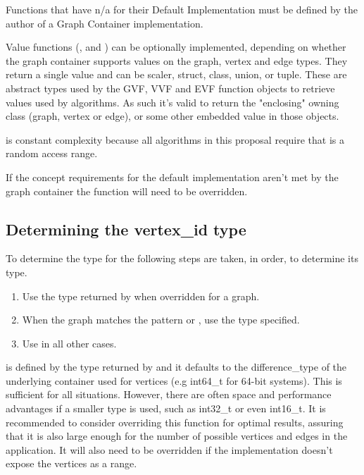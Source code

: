 Functions that have n/a for their Default Implementation must be defined by the author of a Graph Container implementation. 

Value functions (,  and ) can be optionally implemented, 
depending on whether the graph container supports values on the graph, vertex and edge types. They return a single value and can 
be scaler, struct, class, union, or tuple. These are abstract types used by the GVF, VVF and EVF function objects to retrieve
values used by algorithms. As such it's valid to return the "enclosing" owning class (graph, vertex or edge), or some other
embedded value in those objects.

 is constant complexity because all algorithms in this proposal require that  is a random access range. 

If the concept requirements for the default implementation aren't met by the graph container the function will need to be overridden.

\subsection{Determining the vertex\_id type}
To determine the type for  the following steps are taken, in order, to determine its type.
\begin{enumerate}
    \item Use the type returned by  when overridden for a graph.
    \item When the graph matches the pattern  or ,
          use the  type specified.
    \item Use  in all other cases.
\end{enumerate}

 is defined by the type returned by  and it defaults to the difference\_type of the underlying container used for vertices (e.g int64\_t for 64-bit systems). 
This is sufficient for all situations. However, there are often space and performance advantages if a smaller type is used, such as int32\_t or even int16\_t. It is recommended to consider overriding 
this function for optimal results, assuring that it is also large enough for the number of possible vertices and edges in the application. It will also need to be overridden if the implementation doesn't 
expose the vertices as a range.

